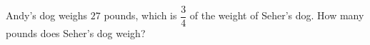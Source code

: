 Andy's dog weighs $27$ pounds, which is $\dfrac34$ of the weight of Seher's dog. How many pounds does Seher's dog weigh?
